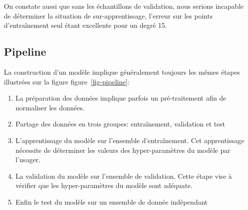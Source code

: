 \documentclass[
  11pt,
  letterpaper,
  open=any,
  twoside=false,
  french]{scrbook}
\begin{document}
On constate aussi que sans les échantillons de validation, nous serions
incapable de déterminer la situation de sur-apprentissage, l'erreur sur
les points d'entraînement seul étant excellente pour un degré 15.

\subsection{Pipeline}\label{pipeline}

La construction d'un modèle implique généralement toujours les mêmes
étapes illustrées sur la figure figure~\ref{fig-pipeline}:

\begin{enumerate}
\def\labelenumi{\arabic{enumi}.}
\item
  La préparation des données implique parfois un pré-traitement afin de
  normaliser les données.
\item
  Partage des données en trois groupes: entraînement, validation et test
\item
  L'apprentissage du modèle sur l'ensemble d'entraînement. Cet
  apprentissage nécessite de déterminer les valeurs des hyper-paramètres
  du modèle par l'usager.
\item
  La validation du modèle sur l'ensemble de validation. Cette étape vise
  à vérifier que les hyper-paramètres du modèle sont adéquate.
\item
  Enfin le test du modèle sur un ensemble de donnée indépendant
\end{enumerate}
\end{document}
